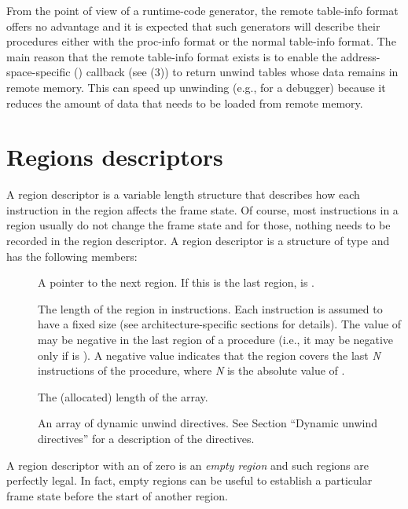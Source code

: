 \documentclass{article}
\begin{document}
From the point of view of a runtime-code generator, the remote
table-info format offers no advantage and it is expected that such
generators will describe their procedures either with the proc-info
format or the normal table-info format.  The main reason that the
remote table-info format exists is to enable the
address-space-specific () callback (see
(3)) to return unwind tables whose
data remains in remote memory.  This can speed up unwinding (e.g., for
a debugger) because it reduces the amount of data that needs to be
loaded from remote memory.

\section{Regions descriptors}

A region descriptor is a variable length structure that describes how
each instruction in the region affects the frame state.  Of course,
most instructions in a region usually do not change the frame state and
for those, nothing needs to be recorded in the region descriptor.  A
region descriptor is a structure of type
 and has the following members:
\begin{description}
\item[] A pointer to the
  next region.  If this is the last region,  is .
\item[ ] The length of the region in
  instructions.  Each instruction is assumed to have a fixed size (see
  architecture-specific sections for details).  The value of
   may be negative in the last region of a procedure
  (i.e., it may be negative only if  is ).  A
  negative value indicates that the region covers the last \emph{N}
  instructions of the procedure, where \emph{N} is the absolute value
  of .
\item[ ] The (allocated) length of
  the  array.
\item[ ] An array of dynamic unwind
  directives.  See Section ``Dynamic unwind directives'' for a
  description of the directives.
\end{description}
A region descriptor with an  of zero is an
\emph{empty region} and such regions are perfectly legal.  In fact,
empty regions can be useful to establish a particular frame state
before the start of another region.
\end{document}
